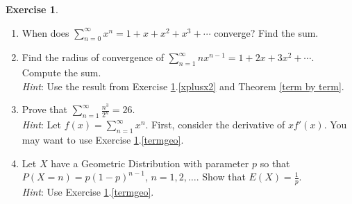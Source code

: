 \documentclass[12pt,letterpaper]{book}
\numberwithin{equation}{section}
\theoremstyle{definition}
\newtheorem{exercise}{\textbf{Exercise}}[chapter]
\begin{document}
\begin{exercise}\label{power series exer} \quad
\begin{enumerate}[\bfseries 1.]
\item \label{xplusx2} When does $\displaystyle{\sum_{n=0}^\infty x^n = 1+x+x^2+x^3+\cdots}$ converge? Find the sum.
\item \label{termgeo} Find the radius of convergence of  $\displaystyle{\sum_{n=1}^\infty nx^{n-1} = 1+2x+3x^2+\cdots.}$ Compute the sum.\\
\textit{Hint}: Use the result from Exercise \ref{power series exer}.\ref{xplusx2} and Theorem \ref{term by term}.
\item Prove that $\displaystyle{\sum_{n=1}^\infty \frac{n^3}{2^n}=26}$. \\
\textit{Hint}: Let $f(x)=\displaystyle{\sum_{n=1}^\infty x^n}$. First, consider the derivative of $xf'(x)$. You may want to use Exercise \ref{power series exer}.\ref{termgeo}.
\item Let $X$ have a Geometric Distribution with parameter $p$ so that $P(X=n)=p(1-p)^{n-1}$, $n=1,2,\ldots$. Show that $E(X)=\frac{1}{p}$.\\
\textit{Hint}: Use Exercise \ref{power series exer}.\ref{termgeo}.
\end{enumerate}
\end{exercise}
\end{document}
